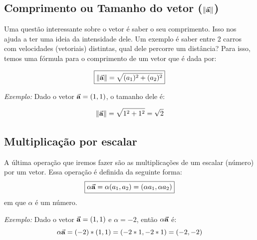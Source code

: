 \documentclass[12pt]{extarticle}
\newcommand{\<}{\langle}
\renewcommand{\>}{\rangle}
\theoremstyle{definition}
\begin{document}
\subsection{Comprimento ou Tamanho do vetor ($\norm{\va{a}}$)}

Uma questão interessante sobre o vetor é saber o seu comprimento. Isso nos ajuda a ter uma ideia da intensidade dele. Um exemplo é saber entre 2 carros com velocidades (vetoriais) distintas, qual dele percorre um distância? Para isso, temos uma fórmula para o comprimento de um vetor que é dada por:

\begin{equation}
    \boxed{\norm{\va{a}} = \sqrt{(a_1)^2 + (a_2)^2}}
\end{equation}

\textit{Exemplo:} Dado o vetor $\va{a} = (1,1)$, o tamanho dele é:

\begin{equation}
    \norm{\va{a}} = \sqrt{1^2 + 1^2} = \sqrt{2} 
    \end{equation}
    
\subsection{Multiplicação por escalar}

A última operação que iremos fazer são as multiplicações de um escalar (número) por um vetor. Essa operação é definida da seguinte forma:
\begin{equation}
    \boxed{\alpha \va{a} = \alpha (a_1,a_2) = (\alpha a_1, \alpha a_2)}
\end{equation}
em que $\alpha$ é um número.

\textit{Exemplo:} Dado o vetor $\va{a}=(1,1)$ e $\alpha=-2$, então $\alpha\va{a}$ é:
\begin{equation}
    \alpha\va{a} = (-2)*(1,1) = (-2*1,-2*1) = (-2,-2)
\end{equation}
\end{document}
